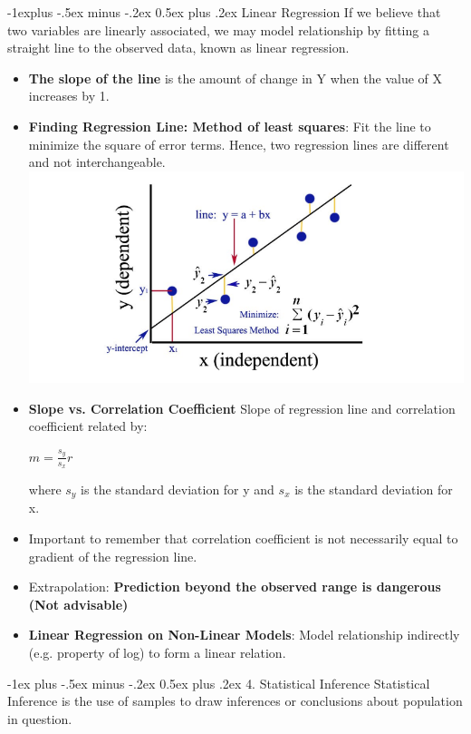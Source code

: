 \documentclass[10pt, landscape]{article}
\makeatletter
\renewcommand{\section}{\@startsection{section}{1}{0mm}%
                                {-1ex plus -.5ex minus -.2ex}%
                                {0.5ex plus .2ex}%
                                {\normalfont\large\bfseries}}
\renewcommand{\subsection}{\@startsection{subsection}{2}{0mm}%
                                {-1explus -.5ex minus -.2ex}%
                                {0.5ex plus .2ex}%
                                {\normalfont\normalsize\bfseries}}
\makeatother
\begin{document}
\begin{multicols*}{4}
\subsection{Linear Regression}
If we believe that two variables are linearly associated, we may model relationship by fitting a straight line to the observed data, known as linear regression.
\begin{itemize}
	\item \textbf{The slope of the line} is the amount of change in Y when the value of X increases by 1.
	\item \textbf{Finding Regression Line: Method of least squares}: Fit the line to minimize the square of error terms. Hence, two regression lines are different and not interchangeable.
	\includegraphics[width = \linewidth]{leastsquares}
	\item \textbf{Slope vs. Correlation Coefficient} Slope of regression line and correlation coefficient related by: \\
	\centerline{ \large $ m = \frac{s_y}{s_x} r $ }
	where $s_y$ is the standard deviation for y and $s_x$ is the standard deviation for x.
	
	\item Important to remember that correlation coefficient is not necessarily equal to gradient of the regression line.
	\item Extrapolation: \textbf{Prediction beyond the observed range is dangerous (Not advisable)}
	\item \textbf{Linear Regression on Non-Linear Models}: Model relationship indirectly (e.g. property of log) to form a linear relation.
\end{itemize}

\section{4. Statistical Inference}
Statistical Inference is the use of samples to draw inferences or conclusions about population in question.


\end{multicols*}
\end{document}
